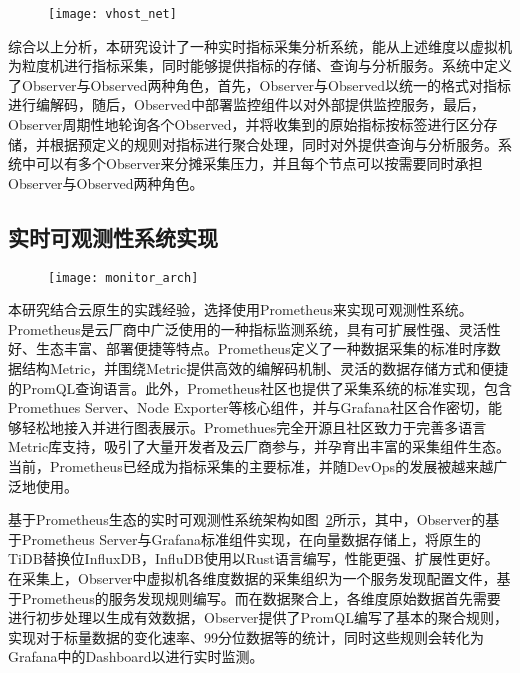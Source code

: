 \begin{figure}[!htbp]
    \centering
    \texttt{[image: vhost\_net]}
    \label{fig:vhost_net}
\end{figure}

综合以上分析，本研究设计了一种实时指标采集分析系统，能从上述维度以虚拟机为粒度机进行指标采集，同时能够提供指标的存储、查询与分析服务。系统中定义了Observer与Observed两种角色，首先，Observer与Observed以统一的格式对指标进行编解码，随后，Observed中部署监控组件以对外部提供监控服务，最后，Observer周期性地轮询各个Observed，并将收集到的原始指标按标签进行区分存储，并根据预定义的规则对指标进行聚合处理，同时对外提供查询与分析服务。系统中可以有多个Observer来分摊采集压力，并且每个节点可以按需要同时承担Observer与Observed两种角色。

\subsection{实时可观测性系统实现}


\begin{figure}[!htbp]
    \centering
    \texttt{[image: monitor\_arch]}
    \label{fig:monitor_arch}
\end{figure}

本研究结合云原生的实践经验，选择使用Prometheus来实现可观测性系统。Prometheus\citep{prometheus}是云厂商中广泛使用的一种指标监测系统，具有可扩展性强、灵活性好、生态丰富、部署便捷等特点。Prometheus定义了一种数据采集的标准时序数据结构Metric，并围绕Metric提供高效的编解码机制、灵活的数据存储方式和便捷的PromQL查询语言。此外，Prometheus社区也提供了采集系统的标准实现，包含Promethues Server、Node Exporter等核心组件，并与Grafana社区合作密切，能够轻松地接入并进行图表展示。Promethues完全开源且社区致力于完善多语言Metric库支持，吸引了大量开发者及云厂商参与，并孕育出丰富的采集组件生态。当前，Prometheus已经成为指标采集的主要标准，并随DevOps的发展被越来越广泛地使用。

基于Prometheus生态的实时可观测性系统架构如图~\ref{fig:monitor_arch}所示，其中，Observer的基于Prometheus Server与Grafana标准组件实现，在向量数据存储上，将原生的TiDB替换位InfluxDB，InfluDB使用以Rust语言编写，性能更强、扩展性更好。在采集上，Observer中虚拟机各维度数据的采集组织为一个服务发现配置文件，基于Prometheus的服务发现规则编写。而在数据聚合上，各维度原始数据首先需要进行初步处理以生成有效数据，Observer提供了PromQL编写了基本的聚合规则，实现对于标量数据的变化速率、99分位数据等的统计，同时这些规则会转化为Grafana中的Dashboard以进行实时监测。

